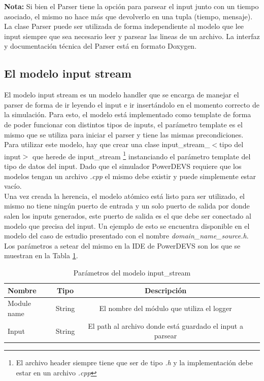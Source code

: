 \documentclass[10pt,a4paper]{article}
\begin{document}
\textbf{Nota:} Si bien el Parser tiene la opción para parsear el input junto con un tiempo asociado, el mismo no hace más que devolverlo en una tupla (tiempo, mensaje).\\

La clase Parser puede ser utilizada de forma independiente al modelo que lee input siempre que sea necesario leer y parsear las lineas de un archivo. La interfaz y documentación técnica del Parser está en formato Doxygen.

\newpage

\subsection{El modelo input stream}

El modelo input stream es un modelo handler que se encarga de manejar el parser de forma de ir leyendo el input e ir insertándolo en el momento correcto de la simulación. Para esto, el modelo está implementado como template de forma de poder funcionar con distintos tipos de inputs, el parámetro template es el mismo que se utiliza para iniciar el parser y tiene las mismas precondiciones. \\

Para utilizar este modelo, hay que crear una clase input\_stream\_$<$tipo del input$>$ que herede de input\_stream \footnote{El archivo header siempre tiene que ser de tipo \textit{.h} y la implementación debe estar en un archivo \textit{.cpp}} instanciando el parámetro template del tipo de datos del input. Dado que el simulador PowerDEVS requiere que los modelos tengan un archivo \textit{.cpp} el mismo debe existir y puede simplemente estar vacío. \\

Una vez creada la herencia, el modelo atómico está listo para ser utilizado, el mismo no tiene ningún puerto de entrada y un solo puerto de salida por donde salen los inputs generados, este puerto de salida es el que debe ser conectado al modelo que precisa del input. Un ejemplo de esto se encuentra disponible en el modelo del caso de estudio presentado con el nombre \textit{domain\_name\_source.h}. \\

Los parámetros a setear del mismo en la IDE de PowerDEVS son los que se muestran en la Tabla \ref{table: input stream parameters}.
\begin{table}[h]
\begin{tabular}{|l|c|c|c|}
  \hline
  \textbf{Nombre} & \textbf{Tipo} & \textbf{Descripción} \\
  \hline
  Module name & String & El nombre del módulo que utiliza el logger \\
  \hline
  Input & String & El path al archivo donde está guardado el input a parsear \\
  \hline
\end{tabular}
\caption{Parámetros del modelo input\_stream}
\label{table: input stream parameters}
\end{table}
\end{document}
